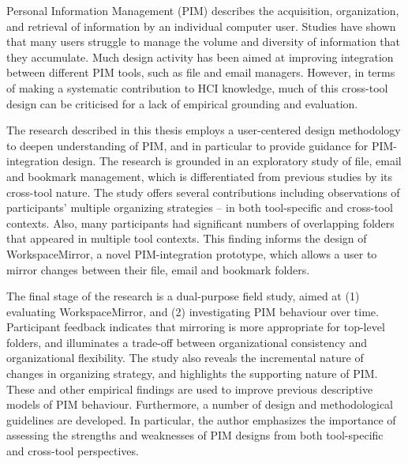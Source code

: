 
Personal Information Management (PIM) describes the acquisition, organization, and retrieval of information by an individual computer user. Studies have shown that many users struggle to manage the volume and diversity of information that they accumulate.  Much design activity has been aimed at improving integration between different PIM tools, such as file and email managers. However, in terms of making a systematic contribution to HCI knowledge, much of this cross-tool design can be criticised for a lack of empirical grounding and evaluation.

The research described in this thesis employs a user-centered design methodology to deepen understanding of PIM, and in particular to provide guidance for PIM-integration design. The research is grounded in an exploratory study of file, email and bookmark management, which is differentiated from previous studies by its cross-tool nature. The study offers several contributions including observations of participants' multiple organizing strategies -- in both tool-specific and cross-tool contexts. Also, many participants had significant numbers of overlapping folders that appeared in multiple tool contexts. This finding informs the design of WorkspaceMirror, a novel PIM-integration prototype, which allows a user to mirror changes between their file, email and bookmark folders. 

The final stage of the research is a dual-purpose field study, aimed at (1) evaluating WorkspaceMirror, and (2) investigating PIM behaviour over time. Participant feedback indicates that mirroring is more appropriate for top-level folders, and illuminates a trade-off between organizational consistency and organizational flexibility. The study also reveals the incremental nature of changes in organizing strategy, and highlights the supporting nature of PIM.  These and other empirical findings are used to improve previous descriptive models of PIM behaviour. Furthermore, a number of design and methodological guidelines are developed. In particular, the author emphasizes the importance of assessing the strengths and weaknesses of PIM designs from both tool-specific and cross-tool perspectives. 
